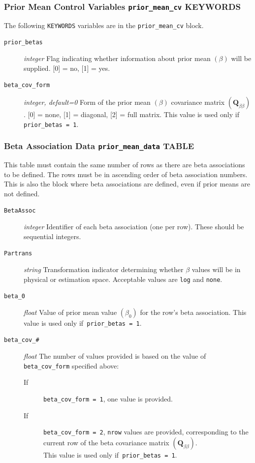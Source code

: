 \documentclass[11pt,oneside,onecolumn]{usgsreport}
\begin{document}
\begin{appendix}
\subsubsection{Prior Mean Control Variables \texttt{prior\_mean\_cv} KEYWORDS}

The following \texttt{KEYWORDS} variables are in the \texttt{prior\_mean\_cv}
block.
\begin{description}
\item [{\texttt{prior\_betas}}] \emph{integer} Flag indicating whether
information about prior mean $\left(\beta\right)$ will be supplied.
{[}0{]} = no, {[}1{]} = yes.
\item [{\texttt{beta\_cov\_form}}] \emph{integer, default=0 }Form of the
prior mean $\left(\beta\right)$ covariance matrix $\left(\mathbf{Q}_{\beta\beta}\right)$.
{[}0{]} = none, {[}1{]} = diagonal, {[}2{]} = full matrix. This value
is used only if\texttt{ prior\_betas = 1}.\emph{ }
\end{description}

\subsubsection{Beta Association Data \texttt{prior\_mean\_data} TABLE}

This table must contain the same number of rows as there are beta
associations to be defined. The rows must be in ascending order of
beta association numbers. This is also the block where beta associations
are defined, even if prior means are not defined.
\begin{description}
\item [{\texttt{BetaAssoc}}] \emph{integer }Identifier of each beta association
(one per row). These should be sequential integers.
\item [{\texttt{Partrans}}] \emph{string }Transformation indicator determining
whether $\beta$ values will be in physical or estimation space. Acceptable
values are \texttt{log} and \texttt{none}. 
\item [{\texttt{beta\_0}}] \emph{float} Value of prior mean value $\left(\beta_{0}\right)$
for the row's beta association. This value is used only if\texttt{
prior\_betas = 1}.
\item [{\texttt{beta\_cov\_\#}}] \emph{float }The number of values provided
is based on the value of \texttt{beta\_cov\_form} specified above:

\begin{description}
\item [{\textmd{If}}] \texttt{beta\_cov\_form = 1}, one value is provided. 
\item [{\textmd{If}}] \texttt{beta\_cov\_form = 2}, \texttt{nrow} values
are provided, corresponding to the current row of the beta covariance
matrix $\left(\mathbf{Q}_{\beta\beta}\right)$.\\
This value is used only if\texttt{ prior\_betas = 1}.
\end{description}
\end{description}


\end{appendix}
\end{document}
